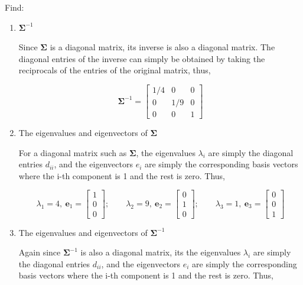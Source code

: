 \documentclass[12pt]{article}
\begin{document}
\noindent Find:

\begin{enumerate}
\item[(a)] $\boldsymbol{\Sigma}^{-1}$

\vspace{0.5em}

\noindent Since $\boldsymbol{\Sigma}$ is a diagonal matrix, its inverse is also a diagonal matrix. The diagonal entries of the inverse can simply be obtained by taking the reciprocals of the entries of the original matrix, thus,

$$
\boxed{
\boldsymbol{\Sigma}^{-1} =
\begin{bmatrix} 1/4 & 0 & 0 \\ 0 & 1/9 & 0 \\ 0 & 0 & 1 \end{bmatrix}
}
$$

\item[(b)] The eigenvalues and eigenvectors of $\boldsymbol{\Sigma}$

\vspace{0.5em}

\noindent For a diagonal matrix such as $\boldsymbol{\Sigma}$, the eigenvalues $\lambda_{i}$ are simply the diagonal entries $d_{ii}$, and the eigenvectors $e_{i}$ are simply the corresponding basis vectors where the i-th component is 1 and the rest is zero. Thus,

$$
\boxed{
\lambda_1 = 4,\ \mathbf{e}_1 = \begin{bmatrix} 1 \\ 0 \\ 0 \end{bmatrix}; \qquad
\lambda_2 = 9,\ \mathbf{e}_2 = \begin{bmatrix} 0 \\ 1 \\ 0 \end{bmatrix}; \qquad
\lambda_3 = 1,\ \mathbf{e}_3 = \begin{bmatrix} 0 \\ 0 \\ 1 \end{bmatrix}
}
$$

\item[(c)] The eigenvalues and eigenvectors of $\boldsymbol{\Sigma}^{-1}$

\vspace{0.5em}

\noindent Again since $\boldsymbol{\Sigma}^{-1}$ is also a diagonal matrix, its the eigenvalues $\lambda_{i}$ are simply the diagonal entries $d_{ii}$, and the eigenvectors $e_{i}$ are simply the corresponding basis vectors where the i-th component is 1 and the rest is zero. Thus,


\end{enumerate}
\end{document}

